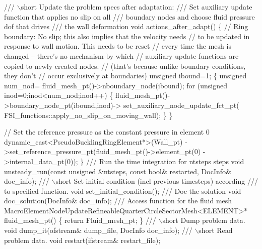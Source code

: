 \begin{DoxyCodeInclude}
\textcolor{comment}{}
\textcolor{comment}{ /// \(\backslash\)short Update the problem specs after adaptation:}
\textcolor{comment}{ /// Set auxiliary update function that applies no slip on all }
\textcolor{comment}{ /// boundary nodes and choose fluid pressure dof that drives}
\textcolor{comment}{ /// the wall deformation}
\textcolor{comment}{} \textcolor{keywordtype}{void} actions\_after\_adapt() 
  \{
   \textcolor{comment}{// Ring boundary: No slip; this also implies that the velocity needs}
   \textcolor{comment}{// to be updated in response to wall motion. This needs to be reset}
   \textcolor{comment}{// every time the mesh is changed -- there's no mechanism by which}
   \textcolor{comment}{// auxiliary update functions are copied to newly created nodes.}
   \textcolor{comment}{// (that's because unlike boundary conditions, they don't }
   \textcolor{comment}{// occur exclusively at boundaries)}
   \textcolor{keywordtype}{unsigned} ibound=1;
   \{
    \textcolor{keywordtype}{unsigned} num\_nod= fluid\_mesh\_pt()->nboundary\_node(ibound);
    \textcolor{keywordflow}{for} (\textcolor{keywordtype}{unsigned} inod=0;inod<num\_nod;inod++)
     \{
      fluid\_mesh\_pt()->boundary\_node\_pt(ibound,inod)->
       set\_auxiliary\_node\_update\_fct\_pt(
        FSI\_functions::apply\_no\_slip\_on\_moving\_wall); 
     \}
   \}
   
   \textcolor{comment}{// Set the reference pressure as the constant pressure in element 0}
   \textcolor{keyword}{dynamic\_cast<}PseudoBucklingRingElement*\textcolor{keyword}{>}(Wall\_pt)
    ->set\_reference\_pressure\_pt(fluid\_mesh\_pt()->element\_pt(0)
                                ->internal\_data\_pt(0));
  \}
   \textcolor{comment}{}
\textcolor{comment}{ /// Run the time integration for ntsteps steps}
\textcolor{comment}{} \textcolor{keywordtype}{void} unsteady\_run(\textcolor{keyword}{const} \textcolor{keywordtype}{unsigned} &ntsteps, \textcolor{keyword}{const} \textcolor{keywordtype}{bool}& restarted,
                   DocInfo& doc\_info);
\textcolor{comment}{}
\textcolor{comment}{ /// \(\backslash\)short Set initial condition (incl previous timesteps) according}
\textcolor{comment}{ /// to specified function. }
\textcolor{comment}{} \textcolor{keywordtype}{void} set\_initial\_condition();
 \textcolor{comment}{}
\textcolor{comment}{ /// Doc the solution}
\textcolor{comment}{} \textcolor{keywordtype}{void} doc\_solution(DocInfo& doc\_info);
\textcolor{comment}{}
\textcolor{comment}{ /// Access function for the fluid mesh}
\textcolor{comment}{} MacroElementNodeUpdateRefineableQuarterCircleSectorMesh<ELEMENT>* fluid\_mesh\_pt()
  \{
   \textcolor{keywordflow}{return} Fluid\_mesh\_pt; 
  \}
 \textcolor{comment}{}
\textcolor{comment}{ /// \(\backslash\)short Dump problem data.}
\textcolor{comment}{} \textcolor{keywordtype}{void} dump\_it(ofstream& dump\_file, DocInfo doc\_info);
\textcolor{comment}{}
\textcolor{comment}{ /// \(\backslash\)short Read problem data.}
\textcolor{comment}{} \textcolor{keywordtype}{void} restart(ifstream& restart\_file);


\end{DoxyCodeInclude}
